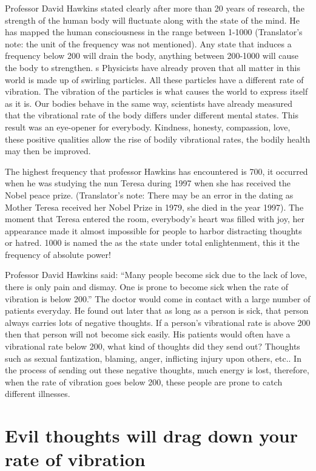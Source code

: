 \documentclass[
]{book}
\begin{document}
Professor David Hawkins stated clearly after more than 20 years of research, the strength of the human body will fluctuate along with the state of the mind. He has mapped the human consciousness in the range between 1-1000 (Translator's note: the unit of the frequency was not mentioned). Any state that induces a frequency below 200 will drain the body, anything between 200-1000 will cause the body to strengthen.
s Physicists have already proven that all matter in this world is made up of swirling particles. All these particles have a different rate of vibration. The vibration of the particles is what causes the world to express itself as it is. Our bodies behave in the same way, scientists have already measured that the vibrational rate of the body differs under different mental states. This result was an eye-opener for everybody. Kindness, honesty, compassion, love, these positive qualities allow the rise of bodily vibrational rates, the bodily health may then be improved.

The highest frequency that professor Hawkins has encountered is 700, it occurred when he was studying the nun Teresa during 1997 when she has received the Nobel peace prize. (Translator's note: There may be an error in the dating as Mother Teresa received her Nobel Prize in 1979, she died in the year 1997). The moment that Teresa entered the room, everybody's heart was filled with joy, her appearance made it almost impossible for people to harbor distracting thoughts or hatred. 1000 is named the as the state under total enlightenment, this it the frequency of absolute power!

Professor David Hawkins said: ``Many people become sick due to the lack of love, there is only pain and dismay. One is prone to become sick when the rate of vibration is below 200.'' The doctor would come in contact with a large number of patients everyday. He found out later that as long as a person is sick, that person always carries lots of negative thoughts. If a person's vibrational rate is above 200 then that person will not become sick easily. His patients would often have a vibrational rate below 200, what kind of thoughts did they send out? Thoughts such as sexual fantization, blaming, anger, inflicting injury upon others, etc.. In the process of sending out these negative thoughts, much energy is lost, therefore, when the rate of vibration goes below 200, these people are prone to catch different illnesses.

\hypertarget{evil-thoughts-will-drag-down-your-rate-of-vibration}{%
\section{Evil thoughts will drag down your rate of vibration}\label{evil-thoughts-will-drag-down-your-rate-of-vibration}}
\end{document}
